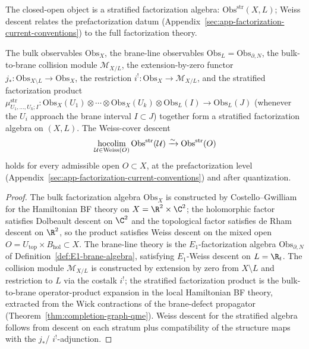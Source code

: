 The closed-open object is a stratified factorization algebra:
\(\mathrm{Obs}^{\mathrm{str}}(X,L)\); Weiss descent relates the
prefactorization datum (Appendix~\ref{sec:app-factorization-current-conventions})
to the full factorization theory.

\begin{thm}
\label{thm:completion-stratified-factorization}
The bulk observables \(\mathrm{Obs}_X\), the brane-line observables
\(\mathrm{Obs}_L=\mathrm{Obs}_{\partial,N}\), the bulk-to-brane
collision module
\(\mathcal M_{X/L}\), the extension-by-zero functor
\(j_*:\mathrm{Obs}_{X\setminus L}\to\mathrm{Obs}_X\), the
restriction \(i^!:\mathrm{Obs}_X\to\mathcal M_{X/L}\), and the
stratified factorization product
\(\mu^{\mathrm{str}}_{U_1,\ldots,U_k;I}:\mathrm{Obs}_X(U_1)\otimes\cdots
\otimes\mathrm{Obs}_X(U_k)\otimes\mathrm{Obs}_L(I)\to\mathrm{Obs}_L(J)\)
(whenever the \(U_i\) approach the brane interval \(I\subset J\))
together form a stratified factorization algebra on \((X,L)\).
The Weiss-cover descent
\[
  \operatornamewithlimits{hocolim}_{\mathcal U\in\mathrm{Weiss}(O)}
   \mathrm{Obs}^{\mathrm{str}}(\mathcal U)
  \xrightarrow{\sim}\mathrm{Obs}^{\mathrm{str}}(O)
\]
holds for every admissible open \(O\subset X\), at the
prefactorization level (Appendix~\ref{sec:app-factorization-current-conventions})
and after quantization.
\end{thm}

\begin{proof}
The bulk factorization algebra \(\mathrm{Obs}_X\) is constructed
by Costello--Gwilliam \cite{costello-gwilliam} for the Hamiltonian
BF theory on \(X=\R^2\times\C^2\); the holomorphic factor satisfies
Dolbeault descent on \(\C^2\) and the topological factor satisfies
de Rham descent on \(\R^2\), so the product satisfies Weiss
descent on the mixed open
\(O=U_{\mathrm{top}}\times B_{\mathrm{hol}}\subset X\).  The
brane-line theory is the \(E_1\)-factorization algebra
\(\mathrm{Obs}_{\partial,N}\) of
Definition~\ref{def:E1-brane-algebra}, satisfying \(E_1\)-Weiss
descent on \(L=\R_t\).  The collision module
\(\mathcal M_{X/L}\) is constructed by extension by zero from
\(X\setminus L\) and restriction to \(L\) via the costalk \(i^!\);
the stratified factorization product is the bulk-to-brane
operator-product expansion in the local Hamiltonian BF theory,
extracted from the Wick contractions of the brane-defect
propagator (Theorem~\ref{thm:completion-graph-qme}).  Weiss descent
for the stratified algebra follows from descent on each stratum
plus compatibility of the structure maps with the \(j_*\)/
\(i^!\)-adjunction.
\end{proof}

